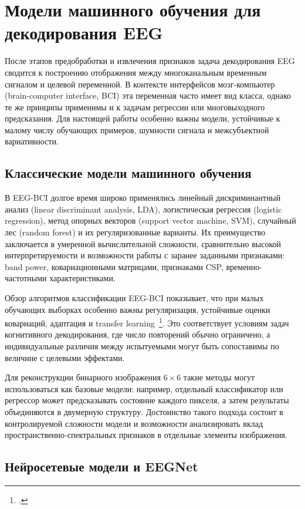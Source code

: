 \section{Модели машинного обучения для декодирования EEG}

После этапов предобработки и извлечения признаков задача декодирования EEG сводится к построению отображения между многоканальным временным сигналом и целевой переменной. В контексте интерфейсов мозг-компьютер (brain-computer interface, BCI) эта переменная часто имеет вид класса, однако те же принципы применимы и к задачам регрессии или многовыходного предсказания. Для настоящей работы особенно важны модели, устойчивые к малому числу обучающих примеров, шумности сигнала и межсубъектной вариативности.

\subsection{Классические модели машинного обучения}

В EEG-BCI долгое время широко применялись линейный дискриминантный анализ (linear discriminant analysis, LDA), логистическая регрессия (logistic regression), метод опорных векторов (support vector machine, SVM), случайный лес (random forest) и их регуляризованные варианты. Их преимущество заключается в умеренной вычислительной сложности, сравнительно высокой интерпретируемости и возможности работы с заранее заданными признаками: band power, ковариационными матрицами, признаками CSP, временно-частотными характеристиками.

Обзор алгоритмов классификации EEG-BCI показывает, что при малых обучающих выборках особенно важны регуляризация, устойчивые оценки ковариаций, адаптация и transfer learning~\footcite{10.1088/1741-2552/aab2f2}. Это соответствует условиям задач когнитивного декодирования, где число повторений обычно ограничено, а индивидуальные различия между испытуемыми могут быть сопоставимы по величине с целевыми эффектами.

Для реконструкции бинарного изображения $6 \times 6$ такие методы могут использоваться как базовые модели: например, отдельный классификатор или регрессор может предсказывать состояние каждого пикселя, а затем результаты объединяются в двумерную структуру. Достоинство такого подхода состоит в контролируемой сложности модели и возможности анализировать вклад пространственно-спектральных признаков в отдельные элементы изображения.

\subsection{Нейросетевые модели и EEGNet}

